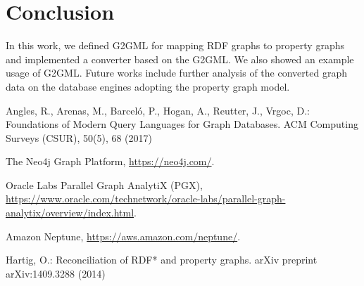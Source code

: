 \documentclass[runningheads]{llncs}
\begin{document}
\section{Conclusion}
In this work, we defined G2GML for mapping RDF graphs to property graphs and implemented a converter based on the G2GML. We also showed an example usage of G2GML. Future works include further analysis of the converted graph data on the database engines adopting the property graph model.


%
%
%
% 
% 
%
\begin{thebibliography}{8}

Angles, R., Arenas, M., Barceló, P., Hogan, A., Reutter, J., Vrgoc, D.: Foundations of Modern Query Languages for Graph Databases. ACM Computing Surveys (CSUR), 50(5), 68 (2017)

The Neo4j Graph Platform, \url{https://neo4j.com/}.

Oracle Labs Parallel Graph AnalytiX (PGX), \url{https://www.oracle.com/technetwork/oracle-labs/parallel-graph-analytix/overview/index.html}.

Amazon Neptune, \url{https://aws.amazon.com/neptune/}.

Hartig, O.: Reconciliation of RDF* and property graphs. arXiv preprint arXiv:1409.3288 (2014)





\end{thebibliography}
\end{document}
